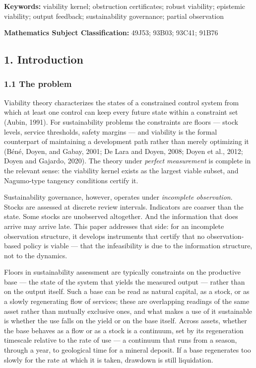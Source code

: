 \documentclass[10pt,twocolumn]{article}
\theoremstyle{definition}
\begin{document}
\begin{abstract}
The calculus is positioned against barrier certificates and estimation
tubes, and its monitoring and institutional consequences ---
observation timing, coarseness, aggregation, and bias --- are drawn.

\end{abstract}

\textbf{Keywords:} viability kernel; obstruction certificates; robust
viability; epistemic viability; output feedback; sustainability
governance; partial observation

\textbf{Mathematics Subject Classification:} 49J53; 93B03; 93C41; 91B76

\subsection{1. Introduction}\label{introduction}

\subsubsection{1.1 The problem}\label{the-problem}

Viability theory characterizes the states of a constrained control system from which at least one control can keep every future state within a constraint set (Aubin, 1991). For sustainability problems the constraints are floors --- stock levels, service thresholds, safety margins --- and viability is the formal counterpart of maintaining a development path rather than merely optimizing it (B\'en\'e, Doyen, and Gabay, 2001; De Lara and Doyen, 2008;
Doyen et al., 2012; Doyen and Gajardo, 2020). The theory under
\emph{perfect measurement} is complete in the relevant sense: the
viability kernel exists as the largest viable subset, and Nagumo-type
tangency conditions certify it.

Sustainability governance, however, operates under \emph{incomplete
observation}. Stocks are assessed at discrete review intervals.
Indicators are coarser than the state. Some stocks are unobserved
altogether. And the information that does arrive may arrive late. This paper addresses that side: for an incomplete observation structure, it develops instruments that certify that no observation-based policy is viable --- that the infeasibility is due to the information structure, not to the dynamics.

Floors in sustainability assessment are typically constraints on the
productive base --- the state of the system that yields the measured
output --- rather than on the output itself. Such a base can be read as
natural capital, as a stock, or as a slowly regenerating flow of
services; these are overlapping readings of the same asset rather than
mutually exclusive ones, and what makes a use of it sustainable is
whether the use falls on the yield or on the base itself. Across
assets, whether the base behaves as a flow or as a stock is a
continuum, set by its regeneration timescale relative to the rate of
use --- a continuum that runs from a season, through a year, to
geological time for a mineral deposit. If a base regenerates too
slowly for the rate at which it is taken, drawdown is still
liquidation.
\end{document}
